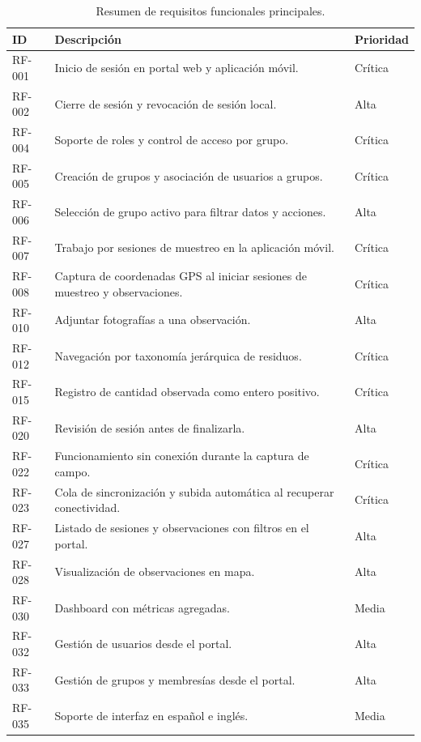 \begin{table}[H]
  \centering
  \caption{Resumen de requisitos funcionales principales.}
  \label{tab:req_funcionales_resumen}
  \begin{tabularx}{\textwidth}{lXl}
    \toprule
    \textbf{ID} & \textbf{Descripción} & \textbf{Prioridad} \\
    \midrule
    RF-001 & Inicio de sesión en portal web y aplicación móvil. & Crítica \\
    RF-002 & Cierre de sesión y revocación de sesión local. & Alta \\
    RF-004 & Soporte de roles y control de acceso por grupo. & Crítica \\
    RF-005 & Creación de grupos y asociación de usuarios a grupos. & Crítica \\
    RF-006 & Selección de grupo activo para filtrar datos y acciones. & Alta \\
    RF-007 & Trabajo por sesiones de muestreo en la aplicación móvil. & Crítica \\
    RF-008 & Captura de coordenadas GPS al iniciar sesiones de muestreo y observaciones. & Crítica \\
    RF-010 & Adjuntar fotografías a una observación. & Alta \\
    RF-012 & Navegación por taxonomía jerárquica de residuos. & Crítica \\
    RF-015 & Registro de cantidad observada como entero positivo. & Crítica \\
    RF-020 & Revisión de sesión antes de finalizarla. & Alta \\
    RF-022 & Funcionamiento sin conexión durante la captura de campo. & Crítica \\
    RF-023 & Cola de sincronización y subida automática al recuperar conectividad. & Crítica \\
    RF-027 & Listado de sesiones y observaciones con filtros en el portal. & Alta \\
    RF-028 & Visualización de observaciones en mapa. & Alta \\
    RF-030 & Dashboard con métricas agregadas. & Media \\
    RF-032 & Gestión de usuarios desde el portal. & Alta \\
    RF-033 & Gestión de grupos y membresías desde el portal. & Alta \\
    RF-035 & Soporte de interfaz en español e inglés. & Media \\
    \bottomrule
  \end{tabularx}
\end{table}

